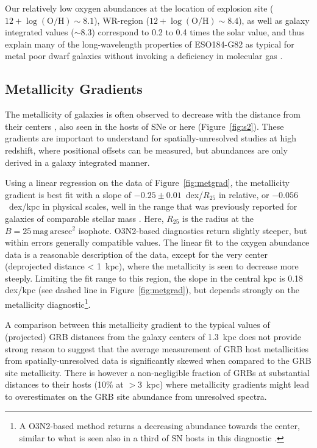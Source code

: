\documentclass[traditabstract]{aa}
\newcommand{\oh}{12+\log(\mathrm{O/H})}
\begin{document}
Our relatively low oxygen abundances at the location of explosion site ($\oh\sim8.1$), WR-region ($\oh\sim8.4$), as well as galaxy integrated values ($\sim8.3$) correspond to 0.2 to 0.4 times the solar value, and thus explain many of the long-wavelength properties of ESO184-G82 as typical for metal poor dwarf galaxies without invoking a deficiency in molecular gas \citep{2016arXiv160901742M}.


\subsection{Metallicity Gradients}
\label{sec:metgrad}

The metallicity of galaxies is often observed to decrease with the distance from their centers \citep[e.g.][]{1994ApJ...420...87Z, 2014A&A...563A..49S}, also seen in the hosts of SNe \citep{2016A&A...591A..48G} or here (Figure~\ref{fig:s2}). These gradients are important to understand for spatially-unresolved studies at high redshift, where positional offsets can be measured, but abundances are only derived in a galaxy integrated manner. 

Using a linear regression on the data of Figure~\ref{fig:metgrad}, the metallicity gradient is best fit with a slope of $-0.25\pm0.01$~dex/$R_{25}$ in relative, or $-0.056$~dex/kpc in physical scales, well in the range that was previously reported for galaxies of comparable stellar mass \citep{2015MNRAS.448.2030H}. Here, $R_{25}$ is the radius at the $B=25\,\mathrm{mag}\,\mathrm{arcsec}^2$ isophote. O3N2-based diagnostics return slightly steeper, but within errors generally compatible values. The linear fit to the oxygen abundance data is a reasonable description of the data, except for the very center (deprojected distance < 1~kpc), where the metallicity is seen to decrease more steeply. Limiting the fit range to this region, the slope in the central kpc is 0.18 dex/kpc (see dashed line in Figure~\ref{fig:metgrad}), but depends strongly on the metallicity diagnostic\footnote{A O3N2-based method returns a decreasing abundance towards the center, similar to what is seen also in a third of SN hosts in this diagnostic \citep{2016A&A...591A..48G}.}.

A comparison between this metallicity gradient to the typical values of (projected) GRB distances from the galaxy centers of 1.3~kpc \citep{2016ApJ...817..144B} does not provide strong reason to suggest that the average measurement of GRB host metallicities from spatially-unresolved data is significantly skewed when compared to the GRB site metallicity. There is however a non-negligible fraction of GRBs at substantial distances to their hosts (10\% at $>3$~kpc) where metallicity gradients might lead to overestimates on the GRB site abundance from unresolved spectra.
\end{document}
